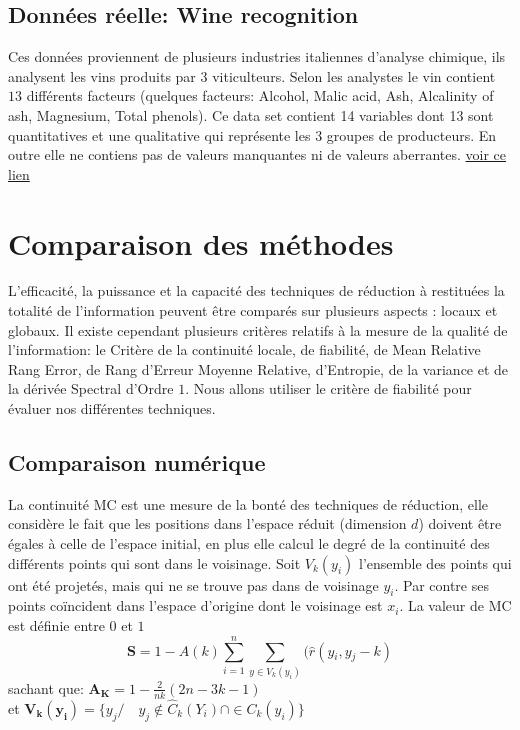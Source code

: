 \documentclass[twoside,twocolumn]{article}
\begin{document}
\subsection{Données réelle: Wine recognition}
 
Ces données proviennent de plusieurs industries italiennes d’analyse chimique, ils analysent les vins produits par $3$ viticulteurs. Selon les analystes le vin contient $13$ différents facteurs (quelques facteurs: Alcohol, Malic acid, Ash, Alcalinity of ash, Magnesium, Total phenols). Ce data set contient 14 variables dont 13 sont quantitatives et une qualitative qui représente les 3 groupes de producteurs. En outre elle ne contiens pas de valeurs manquantes ni de valeurs aberrantes. \href{http://archive.ics.uci.edu/ml/datasets/Wine
}{voir ce lien}

\section{Comparaison des méthodes}
L’efficacité, la puissance et la capacité des techniques de réduction à restituées la totalité de l’information peuvent être comparés sur plusieurs aspects : locaux et globaux. Il existe cependant plusieurs  critères relatifs à la mesure de la qualité de l’information: le Critère de la continuité locale, de fiabilité, de Mean Relative Rang Error, de Rang d’Erreur Moyenne Relative, d’Entropie, de la variance et de la dérivée Spectral d’Ordre $1$. Nous  allons utiliser le critère de fiabilité pour évaluer nos différentes techniques. \cite{Maaten08}

\subsection{ Comparaison numérique}
La continuité MC est une mesure de la bonté des techniques de réduction, elle considère le fait que les positions dans l’espace réduit (dimension $d$) doivent être égales à celle de l’espace initial, en plus elle calcul le degré de la continuité des différents points qui sont dans le voisinage. Soit  $V_{k}(y_i)$ l’ensemble des points qui ont été projetés, mais qui ne se trouve pas dans de voisinage $y_i$. Par contre ses points coïncident dans l'espace d’origine dont le voisinage est $x_i$. La valeur de MC est définie entre $0$ et $1$ \cite{Khoder13}
\[ \mathbf{S}= 1-A(k)  \sum_{i=1}^{n}\sum_{y \in V_{k}(y_i)}^{} (\hat r(y{_i}, y{_j} -k)\] sachant que: $\mathbf {A_K}= 1- \frac{2}{nk} (2n-3k-1)$ \\ et $\mathbf {V_{k}(y_i)}=  \{ {y_j} /\quad {y_j} \not\in 
\hat C{_k}(Y_i) \cap \in C{_k}(y_i)\}$ \cite{Wang12} \cite{Maaten08}
\end{document}
